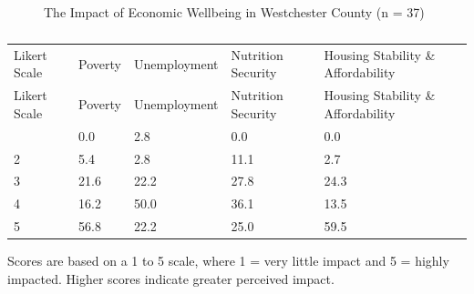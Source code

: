 \documentclass[
  english,
  letterpaper,
]{report}
\begin{document}
\begin{figure}


\caption{\label{fig-wc-eco-wellbeing}The Impact of Economic Wellbeing in
Westchester County (n = 37)}

\end{figure}%

\begin{longtable}[]{@{}lllll@{}}

\caption{\label{tbl-wc-eco-wellbeing}The Impact of Economic Wellbeing in
Westchester County (n = 37)}

\tabularnewline

\caption{}\label{T_bcdd4}\tabularnewline
\toprule\noalign{}
Likert Scale & Poverty & Unemployment & Nutrition Security & Housing
Stability \& Affordability \\
\midrule\noalign{}
\endfirsthead
\toprule\noalign{}
Likert Scale & Poverty & Unemployment & Nutrition Security & Housing
Stability \& Affordability \\
\midrule\noalign{}
\endhead
\bottomrule\noalign{}
\endlastfoot
1 & 0.0 & 2.8 & 0.0 & 0.0 \\
2 & 5.4 & 2.8 & 11.1 & 2.7 \\
3 & 21.6 & 22.2 & 27.8 & 24.3 \\
4 & 16.2 & 50.0 & 36.1 & 13.5 \\
5 & 56.8 & 22.2 & 25.0 & 59.5 \\

\end{longtable}

\begin{tcolorbox}[enhanced jigsaw, breakable, leftrule=.75mm, title=\textcolor{quarto-callout-note-color}{\faInfo}\hspace{0.5em}{Note}, bottomrule=.15mm, opacityback=0, left=2mm, colback=white, bottomtitle=1mm, coltitle=black, colbacktitle=quarto-callout-note-color!10!white, colframe=quarto-callout-note-color-frame, opacitybacktitle=0.6, toptitle=1mm, titlerule=0mm, arc=.35mm, rightrule=.15mm, toprule=.15mm]

Scores are based on a 1 to 5 scale, where 1 = very little impact and 5 =
highly impacted. Higher scores indicate greater perceived impact.

\end{tcolorbox}
\end{document}
